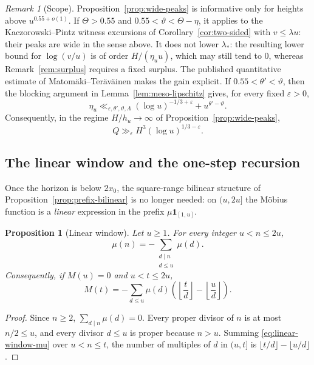 \documentclass[11pt]{amsart}
\numberwithin{equation}{section}
\theoremstyle{plain}
\newtheorem{proposition}[theorem]{Proposition}
\theoremstyle{definition}
\theoremstyle{remark}
\newtheorem{remark}[theorem]{Remark}
\begin{document}
\begin{remark}[Scope]
\label{rem:wide-peaks-scope}
Proposition~\ref{prop:wide-peaks} is informative only for heights above
$u^{0.55+o(1)}$. If $\Theta>0.55$ and $0.55<\vartheta<\Theta-\eta$, it
applies to the Kaczorowski--Pintz witness excursions of
Corollary~\ref{cor:two-sided} with $v\le\lambda u$: their peaks are wide in
the sense above. It does not lower $\lambda_*$: the resulting lower bound
for $\log(v/u)$ is of order $H/(\eta_uu)$, which may still tend to $0$,
whereas Remark~\ref{rem:surplus} requires a fixed surplus. The published
quantitative estimate of Matom\"aki--Ter\"av\"ainen
\cite[Theorem~1.1]{MatomakiTeravainen2023} makes the gain explicit. If
$0.55<\theta'<\vartheta$, then the blocking argument in
Lemma~\ref{lem:meso-lipschitz} gives, for every fixed $\varepsilon>0$,
\[
\eta_u\ll_{\varepsilon,\theta',\vartheta,\Lambda}
(\log u)^{-1/3+\varepsilon}+u^{\theta'-\vartheta}.
\]
Consequently, in the regime $H/h_u\to\infty$ of
Proposition~\ref{prop:wide-peaks},
\[
Q\gg_{\varepsilon}H^3(\log u)^{1/3-\varepsilon}.
\]
\end{remark}



\subsection{The linear window and the one-step recursion}
\label{subsec:linear-window}

Once the horizon is below $2x_0$, the square-range bilinear structure of
Proposition~\ref{prop:prefix-bilinear} is no longer needed: on $(u,2u]$ the
M\"obius function is a \emph{linear} expression in the prefix
$\mu\mathbf 1_{[1,u]}$.

\begin{proposition}[Linear window]
\label{prop:linear-window}
Let $u\ge1$. For every integer $u<n\le2u$,
\begin{equation}
\label{eq:linear-window-mu}
\mu(n)=-\sum_{\substack{d\mid n\\ d\le u}}\mu(d).
\end{equation}
Consequently, if $M(u)=0$ and $u<t\le2u$,
\begin{equation}
\label{eq:linear-window-M}
M(t)=-\sum_{d\le u}\mu(d)\left(\left\lfloor\frac td\right\rfloor
-\left\lfloor\frac ud\right\rfloor\right).
\end{equation}
\end{proposition}

\begin{proof}
Since $n\ge2$, $\sum_{d\mid n}\mu(d)=0$. Every proper divisor of $n$ is at
most $n/2\le u$, and every divisor $d\le u$ is proper because $n>u$. Summing
\eqref{eq:linear-window-mu} over $u<n\le t$, the number of multiples of $d$
in $(u,t]$ is $\lfloor t/d\rfloor-\lfloor u/d\rfloor$.
\end{proof}
\end{document}

